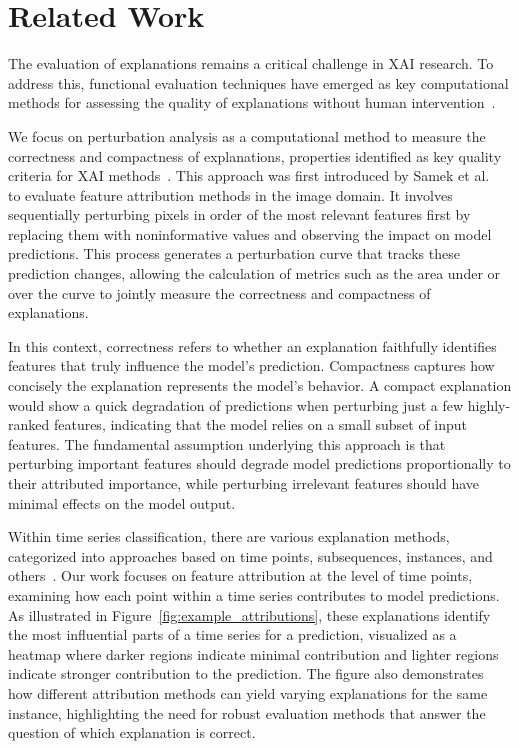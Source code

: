 \section{Related Work}
\label{h:related-work}

The evaluation of explanations remains a critical challenge in XAI research. To address this, functional evaluation techniques have emerged as key computational methods for assessing the quality of explanations without human intervention~\cite{doshi-velez.kim_2018_considerations,nauta.etal_2023_anecdotal}. 

We focus on perturbation analysis as a computational method to measure the correctness and compactness of explanations, properties identified as key quality criteria for XAI methods~\cite{nauta.etal_2023_anecdotal}. This approach was first introduced by Samek et al.~\cite{samek.etal_2017_evaluating} to evaluate feature attribution methods in the image domain. It involves sequentially perturbing pixels in order of the most relevant features first by replacing them with noninformative values and observing the impact on model predictions. This process generates a perturbation curve that tracks these prediction changes, allowing the calculation of metrics such as the area under or over the curve to jointly measure the correctness and compactness of explanations.

In this context, correctness refers to whether an explanation faithfully identifies features that truly influence the model's prediction. Compactness captures how concisely the explanation represents the model's behavior. A compact explanation would show a quick degradation of predictions when perturbing just a few highly-ranked features, indicating that the model relies on a small subset of input features. The fundamental assumption underlying this approach is that perturbing important features should degrade model predictions proportionally to their attributed importance, while perturbing irrelevant features should have minimal effects on the model output.

Within time series classification, there are various explanation methods, categorized into approaches based on time points, subsequences, instances, and others~\cite{theissler.etal_2022_explainable}. Our work focuses on feature attribution at the level of time points, examining how each point within a time series contributes to model predictions. As illustrated in Figure~\ref{fig:example_attributions}, these explanations identify the most influential parts of a time series for a prediction, visualized as a heatmap where darker regions indicate minimal contribution and lighter regions indicate stronger contribution to the prediction. The figure also demonstrates how different attribution methods can yield varying explanations for the same instance, highlighting the need for robust evaluation methods that answer the question of which explanation is correct.

